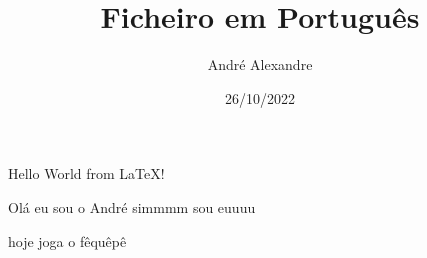 \documentclass[11pt,openright,twoside]{report}
\title{\textbf{Ficheiro em Português}}
\author{André Alexandre}
\date{26/10/2022}
\begin{document}
\maketitle
\tableofcontents 
Hello World from \LaTeX! 

Olá eu sou o André simmmm sou euuuu

hoje joga o fêquêpê
\end{document}
